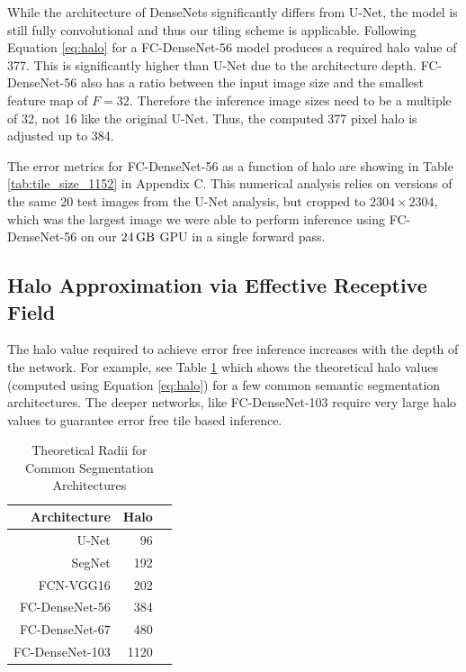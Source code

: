 \documentclass[10pt, indentfirst]{article}
\begin{document}
While the architecture of DenseNets significantly differs from U-Net, the model is still fully convolutional and thus our tiling scheme is applicable.
Following Equation \ref{eq:halo} for a FC-DenseNet-56 \citep{Jegou2017} model produces a required halo value of 377.
This is significantly higher than U-Net due to the architecture depth.
FC-DenseNet-56 also has a ratio between the input image size and the smallest feature map of $F = 32$.
Therefore the inference image sizes need to be a multiple of 32, not 16 like the original U-Net.
Thus, the computed 377 pixel halo is adjusted up to 384.

The error metrics for FC-DenseNet-56 as a function of halo are showing in Table \ref{tab:tile_size_1152} in Appendix C.
This numerical analysis relies on versions of the same 20 test images from the U-Net analysis, but cropped to $\num{2304} \times \num{2304}$, which was the largest image we were able to perform inference using FC-DenseNet-56 on our $\SI{24}{\giga\byte}$ GPU in a single forward pass.


\subsection{Halo Approximation via Effective Receptive Field}

The halo value required to achieve error free inference increases with the depth of the network.
For example, see Table \ref{tab:common_radii} which shows the theoretical halo values (computed using Equation \ref{eq:halo}) for a few common semantic segmentation architectures.
The deeper networks, like FC-DenseNet-103 require very large halo values to guarantee error free tile based inference.

\begin{table}
	\centering
	\caption{Theoretical Radii for Common Segmentation Architectures}
	\label{tab:common_radii}
	\begin{tabular}{r|r|r}
		Architecture & Halo &  \\ 
		\hline
		U-Net \citep{Ronneberger2015a} & 96 \\
		SegNet \citep{Badrinarayanan2015a} & 192 \\
		FCN-VGG16 \citep{Long2015} & 202 \\
		FC-DenseNet-56 \citep{Jegou2017} & 384 \\
		FC-DenseNet-67 \citep{Jegou2017} & 480 \\
		FC-DenseNet-103 \citep{Jegou2017} & 1120 \\
	\end{tabular}
\end{table}
\end{document}
